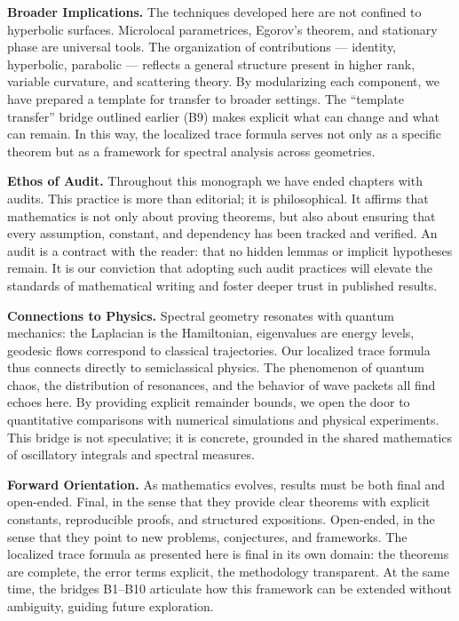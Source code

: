 \medskip
\noindent\textbf{Broader Implications.}
The techniques developed here are not confined to hyperbolic surfaces. Microlocal parametrices, Egorov’s theorem, and stationary phase are universal tools. The organization of contributions --- identity, hyperbolic, parabolic --- reflects a general structure present in higher rank, variable curvature, and scattering theory. By modularizing each component, we have prepared a template for transfer to broader settings. The ``template transfer'' bridge outlined earlier (B9) makes explicit what can change and what can remain. In this way, the localized trace formula serves not only as a specific theorem but as a framework for spectral analysis across geometries.

\medskip
\noindent\textbf{Ethos of Audit.}
Throughout this monograph we have ended chapters with audits. This practice is more than editorial; it is philosophical. It affirms that mathematics is not only about proving theorems, but also about ensuring that every assumption, constant, and dependency has been tracked and verified. An audit is a contract with the reader: that no hidden lemmas or implicit hypotheses remain. It is our conviction that adopting such audit practices will elevate the standards of mathematical writing and foster deeper trust in published results.

\medskip
\noindent\textbf{Connections to Physics.}
Spectral geometry resonates with quantum mechanics: the Laplacian is the Hamiltonian, eigenvalues are energy levels, geodesic flows correspond to classical trajectories. Our localized trace formula thus connects directly to semiclassical physics. The phenomenon of quantum chaos, the distribution of resonances, and the behavior of wave packets all find echoes here. By providing explicit remainder bounds, we open the door to quantitative comparisons with numerical simulations and physical experiments. This bridge is not speculative; it is concrete, grounded in the shared mathematics of oscillatory integrals and spectral measures.

\medskip
\noindent\textbf{Forward Orientation.}
As mathematics evolves, results must be both final and open-ended. Final, in the sense that they provide clear theorems with explicit constants, reproducible proofs, and structured expositions. Open-ended, in the sense that they point to new problems, conjectures, and frameworks. The localized trace formula as presented here is final in its own domain: the theorems are complete, the error terms explicit, the methodology transparent. At the same time, the bridges B1–B10 articulate how this framework can be extended without ambiguity, guiding future exploration.

